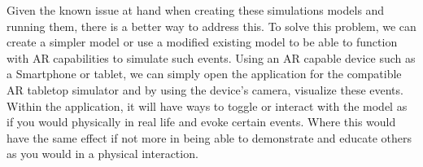 Given the known issue at hand when creating these simulations models and running them, there is a better way to address this. To solve this problem, we can create a simpler model or use a modified existing model to be able to function with AR capabilities to simulate such events. Using an AR capable device such as a Smartphone or tablet, we can simply open the application for the compatible AR tabletop simulator and by using the device's camera, visualize these events. Within the application, it will have ways to toggle or interact with the model as if you would physically in real life and evoke certain events. Where this would have the same effect if not more in being able to demonstrate and educate others as you would in a physical interaction. 